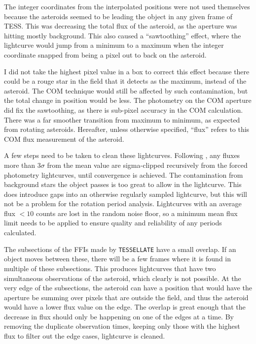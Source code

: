 \documentclass{UCreport}
\begin{document}
The integer coordinates from the interpolated positions were not used themselves because the asteroids seemed to be leading the object in any given frame of TESS.
This was decreasing the total flux of the asteroid, as the aperture  was hitting mostly background.
This also caused a ``sawtoothing'' effect, where the lightcurve would jump from a minimum to a maximum when the integer coordinate snapped from being a pixel out to back on the asteroid.

I did not take the highest pixel value in a box to correct this effect because there could be a rouge star in the field that it detects as the maximum, instead of the asteroid.
The COM technique would still be affected by such contamination, but the total change in position would be less.
The photometry on the COM aperture did fix the sawtoothing, as there is sub-pixel accuracy in the COM calculation.
There was a far smoother transition from maximum to minimum, as expected from rotating asteroids.
Hereafter, unless otherwise specified, ``flux'' refers to this COM flux measurement of the asteroid.

A few steps need to be taken to clean these lightcurves.
Following \citet{McNeill2023}, any fluxes more than $3\sigma$ from the mean value are sigma-clipped recursively from the forced photometry lightcurves, until convergence is achieved.
The contamination from background stars the object passes is too great to allow in the lightcurve.
This does introduce gaps into an otherwise regularly sampled lightcurve, but this will not be a problem for the rotation period analysis.
Lightcurves with an average flux $<10$ counts are lost in the random noise floor, so a minimum mean flux limit needs to be applied to ensure quality and reliability of any periods calculated.

The subsections of the FFIs made by \texttt{TESSELLATE} have a small overlap.
If an object moves between these, there will be a few frames where it is found in multiple of these subsections.
This produces lightcurves that have two simultaneous observations of the asteroid, which clearly is not possible.
At the very edge of the subsections, the asteroid can have a position that would have the aperture be summing over pixels that are outside the field, and thus the asteroid would have a lower flux value on the edge.
The overlap is great enough that the decrease in flux should only be happening on one of the edges at a time.
By removing the duplicate observation times, keeping only those with the highest flux to filter out the edge cases, lightcurve is cleaned. 
\end{document}
